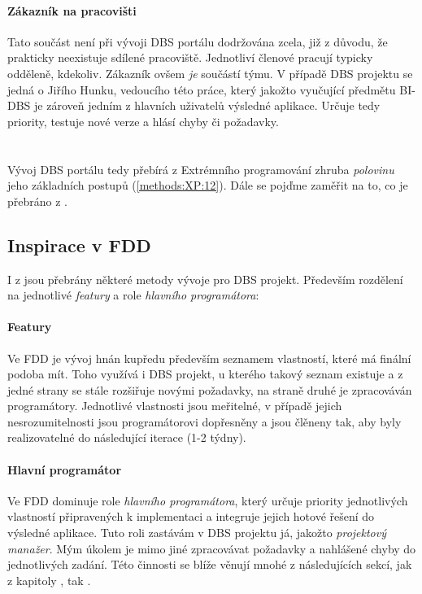 \paragraph{Zákazník na pracovišti}
Tato součást není při vývoji DBS portálu dodržována zcela, již z důvodu, že prakticky neexistuje sdílené pracoviště. Jednotliví členové pracují typicky odděleně, kdekoliv.
Zákazník ovšem \emph{je} součástí týmu. V případě DBS projektu se jedná o Jiřího Hunku, vedoucího této práce, který jakožto vyučující předmětu BI-DBS je zároveň jedním z hlavních uživatelů výsledné aplikace. Určuje tedy priority, testuje nové verze a hlásí chyby či požadavky.
\\
\\
\\
Vývoj DBS portálu tedy přebírá z Extrémního programování zhruba \emph{polovinu} jeho základních postupů (\ref{methods:XP:12}). Dále se pojďme zaměřit na to, co je přebráno z .


\subsection{Inspirace v FDD}

I z  jsou přebrány některé metody vývoje pro DBS projekt. Především rozdělení na jednotlivé \emph{featury} a role \emph{hlavního programátora}:

\paragraph{Featury} Ve FDD je vývoj hnán kupředu především seznamem vlastností, které má finální podoba mít. Toho využívá i DBS projekt, u kterého takový seznam existuje a z jedné strany se stále rozšiřuje novými požadavky, na straně druhé je zpracováván programátory. Jednotlivé vlastnosti jsou meřitelné, v případě jejich nesrozumitelnosti jsou programátorovi dopřesněny a jsou člěneny tak, aby byly realizovatelné do následující iterace (1-2 týdny).

\paragraph{Hlavní programátor}
Ve FDD dominuje role \emph{hlavního programátora}, který určuje priority jednotlivých vlastností připravených k implementaci a integruje jejich hotové řešení do výsledné aplikace. Tuto roli zastávám v DBS projektu já, jakožto \emph{projektový manažer}. Mým úkolem je mimo jiné zpracovávat požadavky a nahlášené chyby do jednotlivých zadání. Této činnosti se blíže věnují mnohé z následujících sekcí, jak z kapitoly , tak .
